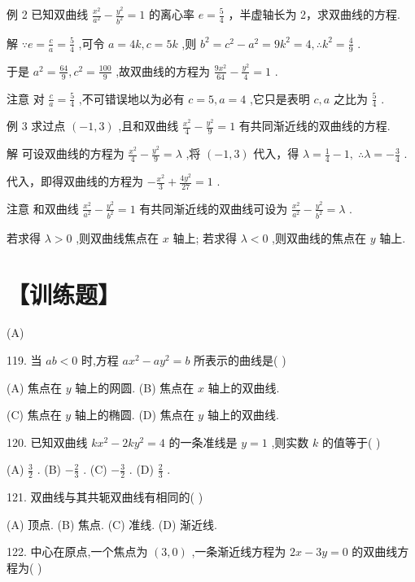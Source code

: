 \documentclass[10pt]{article}
\begin{document}
例 2 已知双曲线 \(\frac{{x}^{2}}{{a}^{2}} - \frac{{y}^{2}}{{b}^{2}} = 1\) 的离心率 \(e = \frac{5}{4}\) ，半虚轴长为 2，求双曲线的方程.

解 \(\because e = \frac{c}{a} = \frac{5}{4}\) ,可令 \(a = {4k},c = {5k}\) ,则 \({b}^{2} = {c}^{2} - {a}^{2} = 9{k}^{2} = 4,\therefore {k}^{2} = \frac{4}{9}\) .

于是 \({a}^{2} = \frac{64}{9},{c}^{2} = \frac{100}{9}\) ,故双曲线的方程为 \(\frac{9{x}^{2}}{64} - \frac{{y}^{2}}{4} = 1\) .

注意 对 \(\frac{c}{a} = \frac{5}{4}\) ,不可错误地以为必有 \(c = 5,a = 4\) ,它只是表明 \(c,a\) 之比为 \(\frac{5}{4}\) .

例 3 求过点 \(\left( {-1,3}\right)\) ,且和双曲线 \(\frac{{x}^{2}}{4} - \frac{{y}^{2}}{9} = 1\) 有共同渐近线的双曲线的方程.

解 可设双曲线的方程为 \(\frac{{x}^{2}}{4} - \frac{{y}^{2}}{9} = \lambda\) ,将 \(\left( {-1,3}\right)\) 代入，得 \(\lambda  = \frac{1}{4} - 1,\;\therefore \lambda  =  - \frac{3}{4}\) .

代入，即得双曲线的方程为 \(- \frac{{x}^{2}}{3} + \frac{4{y}^{2}}{27} = 1\) .

注意 和双曲线 \(\frac{{x}^{2}}{{a}^{2}} - \frac{{y}^{2}}{{b}^{2}} = 1\) 有共同渐近线的双曲线可设为 \(\frac{{x}^{2}}{{a}^{2}} - \frac{{y}^{2}}{{b}^{2}} = \lambda\) .

若求得 \(\lambda  > 0\) ,则双曲线焦点在 \(x\) 轴上; 若求得 \(\lambda  < 0\) ,则双曲线的焦点在 \(y\) 轴上.

\section*{【训练题】}

(A)

119. 当 \({ab} < 0\) 时,方程 \(a{x}^{2} - a{y}^{2} = b\) 所表示的曲线是( )

(A) 焦点在 \(y\) 轴上的网圆. (B) 焦点在 \(x\) 轴上的双曲线.

(C) 焦点在 \(y\) 轴上的椭圆. (D) 焦点在 \(y\) 轴上的双曲线.

120. 已知双曲线 \(k{x}^{2} - {2k}{y}^{2} = 4\) 的一条准线是 \(y = 1\) ,则实数 \(k\) 的值等于( )

(A) \(\frac{3}{2}\) . (B) \(- \frac{2}{3}\) . (C) \(- \frac{3}{2}\) . (D) \(\frac{2}{3}\) .

121. 双曲线与其共轭双曲线有相同的( )

(A) 顶点. (B) 焦点. (C) 准线. (D) 渐近线.

122. 中心在原点,一个焦点为 \(\left( {3,0}\right)\) ,一条渐近线方程为 \({2x} - {3y} = 0\) 的双曲线方程为(   )
\end{document}
